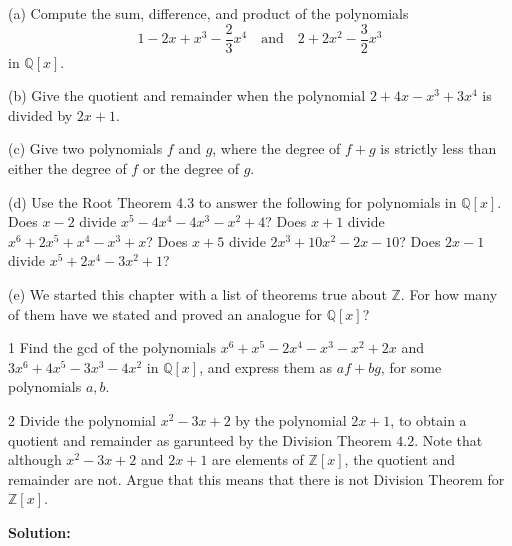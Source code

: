 \begin{problem}[Warmup]{(a)}
    Compute the sum, difference, and product of the polynomials \[1 - 2x + x^3 - \frac{2}{3}x^4 \quad\text{and}\quad 2 + 2x^2 - \frac{3}{2}x^3\] in $\mathbb{Q}[x]$.
\end{problem}
\unsolved

\begin{problem}[Warmup]{(b)}
    Give the quotient and remainder when the polynomial $2 + 4x - x^3 + 3x^4$ is divided by $2x + 1$.
\end{problem}
\unsolved

\begin{problem}[Warmup]{(c)}
    Give two polynomials $f$ and $g$, where the degree of $f + g$ is strictly less than either the degree of $f$ or the degree of $g$.
\end{problem}
\unsolved

\begin{problem}[Warmup]{(d)}
    Use the Root Theorem 4.3 to answer the following for polynomials in $\mathbb{Q}[x]$. Does $x - 2$ divide $x^5 - 4x^4 - 4x^3 - x^2 + 4$? Does $x + 1$ divide $x^6 + 2x^5 + x^4 - x^3 + x$? Does $x + 5$ divide $2x^3 + 10x^2 - 2x - 10$? Does $2x - 1$ divide $x^5 + 2x^4 - 3x^2 + 1$?
\end{problem}
\unsolved

\begin{problem}[Warmup]{(e)}
    We started this chapter with a list of theorems true about $\mathbb{Z}$. For how many of them have we stated and proved an analogue for $\mathbb{Q}[x]$?
\end{problem}
\unsolved

\begin{problem}{1}
    Find the gcd of the polynomials $x^6 + x^5 - 2x^4 - x^3 - x^2 + 2x$ and
    $3x^6 + 4x^5 - 3x^3 - 4x^2$ in $\mathbb{Q}[x]$, and express them as $af + bg$, for
    some polynomials $a, b$.
\end{problem}
\unsolved

\begin{problem}{2}
    Divide the polynomial $x^2 - 3x + 2$ by the polynomial $2x + 1$,
    to obtain a quotient and remainder as garunteed by the Division 
    Theorem $4.2$. Note that although $x^2 - 3x + 2$ and $2x + 1$ are 
    elements of $\mathbb{Z}[x]$, the quotient and remainder are not.
    Argue that this means that there is not Division Theorem for $\mathbb{Z}[x]$.
\end{problem}
\solved

\textbf{Solution:}

